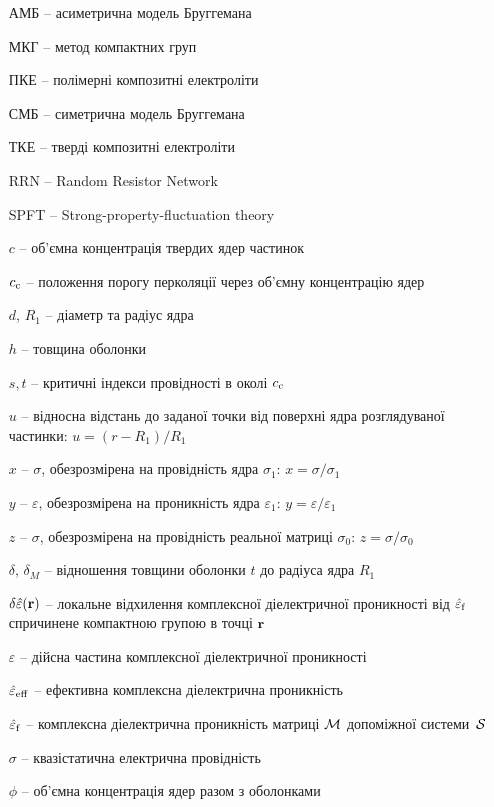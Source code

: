 \documentclass[14pt,twoside]{vakthesis}
\begin{document}
\begin{itemize}
	\item[АМБ --] асиметрична модель Бруггемана
	\item[МКГ --] метод компактних груп
	\item[ПКЕ --] полімерні композитні електроліти
	\item[СМБ --] симетрична модель Бруггемана
	\item[ТКЕ --] тверді композитні електроліти
	\item[RRN --] Random Resistor Network
	\item[SPFT --] Strong-property-fluctuation theory
	
	\item[$c$ --] об'ємна концентрація твердих ядер частинок
	\item[$c_{\rm c}$ --] положення порогу перколяції  через об'ємну концентрацію ядер
	\item[$d$, $R_1$ --] діаметр та радіус ядра
	\item[$h$ --] товщина оболонки
	\item[$s,t$ --] критичні індекси провідності в околі $c_{\rm c}$
	\item[$u$ --] відносна відстань до заданої точки від поверхні ядра розглядуваної частинки: $u=(r-R_1)/R_1$
	\item[$x$ --] $\sigma$, обезрозмірена на провідність ядра $\sigma_1$: $x=\sigma/\sigma_1$
	\item[$y$ --] $\varepsilon$, обезрозмірена на проникність ядра $\varepsilon_1$: $y=\varepsilon/\varepsilon_1$
	\item[${z}$ --] $\sigma$, обезрозмірена на провідність реальної матриці $\sigma_0$: ${z}=\sigma/\sigma_0$
	
	\item[$\delta$, $\delta_M$ --] відношення товщини оболонки $t$ до радіуса ядра $R_1$
	\item[$\delta\hat{\varepsilon}({\bf r})$ --] локальне відхилення комплексної діелектричної проникності від $\hat{\varepsilon}_{\rm f}$ спричинене компактною групою в точці $\bf r$ 
	\item[$\varepsilon$ --] дійсна частина комплексної діелектричної проникності
	\item[$\hat{\varepsilon}_{\rm eff}$ --] ефективна комплексна діелектрична проникність
	\item[$\hat{\varepsilon}_{\rm f}$ --] комплексна діелектрична проникність матриці ${\cal M}$ допоміжної системи~$\cal S$
	\item[$\sigma$ --] квазістатична електрична провідність
	\item[$\phi$ --] об'ємна концентрація ядер разом з оболонками
\end{itemize}
\end{document}
